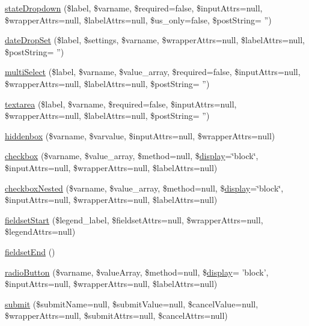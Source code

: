 \begin{DoxyCompactItemize}
\item 
\hyperlink{classg_form_a726da47f5bccd3146ecf936b90a86f29}{state\-Dropdown} (\$label, \$varname, \$required=false, \$input\-Attrs=null, \$wrapper\-Attrs=null, \$label\-Attrs=null, \$us\-\_\-only=false, \$post\-String= '')
\item 
\hyperlink{classg_form_a9d6a45eabcab3b8a17165663cec6e513}{date\-Drop\-Set} (\$label, \$settings, \$varname, \$wrapper\-Attrs=null, \$label\-Attrs=null, \$post\-String= '')
\item 
\hyperlink{classg_form_ae6cae34e565f7fe86b944bcd8e88db60}{multi\-Select} (\$label, \$varname, \$value\-\_\-array, \$required=false, \$input\-Attrs=null, \$wrapper\-Attrs=null, \$label\-Attrs=null, \$post\-String= '')
\item 
\hyperlink{classg_form_a75f5f558be1b3535a68aa45cc7b22339}{textarea} (\$label, \$varname, \$required=false, \$input\-Attrs=null, \$wrapper\-Attrs=null, \$label\-Attrs=null, \$post\-String= '')
\item 
\hyperlink{classg_form_a283b3ac490709e2a0776e9c6472efa96}{hiddenbox} (\$varname, \$varvalue, \$input\-Attrs=null, \$wrapper\-Attrs=null)
\item 
\hyperlink{classg_form_a85c1a0128efc2275bd11b3d1701146d6}{checkbox} (\$varname, \$value\-\_\-array, \$method=null, \$\hyperlink{classg_form_a0b9b6e6acd4a839fc7c2f26f96b5cfa8}{display}=\char`\"{}block\char`\"{}, \$input\-Attrs=null, \$wrapper\-Attrs=null, \$label\-Attrs=null)
\item 
\hyperlink{classg_form_a83c6bbcee34e89edaf5981a1eda2da2b}{checkbox\-Nested} (\$varname, \$value\-\_\-array, \$method=null, \$\hyperlink{classg_form_a0b9b6e6acd4a839fc7c2f26f96b5cfa8}{display}=\char`\"{}block\char`\"{}, \$input\-Attrs=null, \$wrapper\-Attrs=null, \$label\-Attrs=null)
\item 
\hyperlink{classg_form_afa1143ec06e9503ca09d8a83a4c9c7f8}{fieldset\-Start} (\$legend\-\_\-label, \$fieldset\-Attrs=null, \$wrapper\-Attrs=null, \$legend\-Attrs=null)
\item 
\hyperlink{classg_form_a1fff6750ad2be9185ff63cc57c71f6ee}{fieldset\-End} ()
\item 
\hyperlink{classg_form_a6251b59403bb7f0412d315aeb1687cb0}{radio\-Button} (\$varname, \$value\-Array, \$method=null, \$\hyperlink{classg_form_a0b9b6e6acd4a839fc7c2f26f96b5cfa8}{display}= 'block', \$input\-Attrs=null, \$wrapper\-Attrs=null, \$label\-Attrs=null)
\item 
\hyperlink{classg_form_a7934dc382dfb4df433f366ce574b2421}{submit} (\$submit\-Name=null, \$submit\-Value=null, \$cancel\-Value=null, \$wrapper\-Attrs=null, \$submit\-Attrs=null, \$cancel\-Attrs=null)

\end{DoxyCompactItemize}
